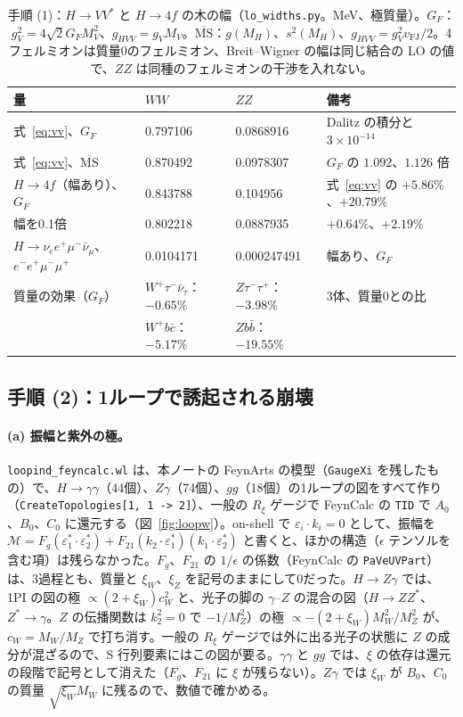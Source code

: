 \documentclass[a4paper,10pt]{ltjsarticle}
\newcommand{\MSbar}{\overline{\mathrm{MS}}}
\begin{document}
\begin{table}[tbp]
\centering\small
\caption{手順 (1)：$H\to VV^*$ と $H\to4f$ の木の幅（\texttt{lo\_widths.py}。MeV、極質量）。$G_F$：$g_V^2=4\sqrt2G_FM_V^2$、$g_{HVV}=g_VM_V$。$\MSbar$：$g(M_H)$、$s^2(M_H)$、$g_{HVV}=g_V^2v_{\mathrm{FJ}}/2$。4フェルミオンは質量0のフェルミオン、Breit--Wigner の幅は同じ結合の LO の値で、$ZZ$ は同種のフェルミオンの干渉を入れない。}
\label{tab:lohvv}
\begin{tabular}{llll}
\toprule
量 & $WW$ & $ZZ$ & 備考 \\
\midrule
式~\eqref{eq:vv}、$G_F$ & 0.797106 & 0.0868916 & Dalitz の積分と $3\times10^{-14}$ \\
式~\eqref{eq:vv}、$\MSbar$ & 0.870492 & 0.0978307 & $G_F$ の $1.092$、$1.126$ 倍 \\
$H\to4f$（幅あり）、$G_F$ & 0.843788 & 0.104956 & 式~\eqref{eq:vv} の $+5.86\%$、$+20.79\%$ \\
\quad 幅を0.1倍 & 0.802218 & 0.0887935 & $+0.64\%$、$+2.19\%$ \\
$H\to\nu_ee^+\mu^-\bar\nu_\mu$、$e^-e^+\mu^-\mu^+$ & 0.0104171 & 0.000247491 & 幅あり、$G_F$ \\
\midrule
質量の効果（$G_F$） & $W^+\tau^-\bar\nu_\tau$：$-0.65\%$ & $Z\tau^-\tau^+$：$-3.98\%$ & 3体、質量0との比 \\
 & $W^+b\bar c$：$-5.17\%$ & $Zb\bar b$：$-19.55\%$ & \\
\bottomrule
\end{tabular}
\end{table}

\subsection{手順 (2)：1ループで誘起される崩壊}\label{sec:step2}

\paragraph{(a) 振幅と紫外の極。}\texttt{loopind\_feyncalc.wl} は、本ノートの FeynArts の模型（\texttt{GaugeXi} を残したもの）で、$H\to\gamma\gamma$（44個）、$Z\gamma$（74個）、$gg$（18個）の1ループの図をすべて作り（\texttt{CreateTopologies[1, 1 -> 2]}）、一般の $R_\xi$ ゲージで FeynCalc の \texttt{TID} で $A_0$、$B_0$、$C_0$ に還元する（図~\ref{fig:loopw}）。on-shell で $\varepsilon_i\cdot k_i=0$ として、振幅を $\mathcal M=F_g(\varepsilon_1^*\cdot\varepsilon_2^*)+F_{21}(k_2\cdot\varepsilon_1^*)(k_1\cdot\varepsilon_2^*)$ と書くと、ほかの構造（$\epsilon$ テンソルを含む項）は残らなかった。$F_g$、$F_{21}$ の $1/\epsilon$ の係数（FeynCalc の \texttt{PaVeUVPart}）は、3過程とも、質量と $\xi_W$、$\xi_Z$ を記号のままにして0だった。$H\to Z\gamma$ では、1PI の図の極 $\propto(2+\xi_W)c_W^2$ と、光子の脚の $\gamma$--$Z$ の混合の図（$H\to ZZ^*$、$Z^*\to\gamma$。$Z$ の伝播関数は $k_2^2=0$ で $-1/M_Z^2$）の極 $\propto-(2+\xi_W)M_W^2/M_Z^2$ が、$c_W=M_W/M_Z$ で打ち消す。一般の $R_\xi$ ゲージでは外に出る光子の状態に $Z$ の成分が混ざるので、S 行列要素にはこの図が要る。$\gamma\gamma$ と $gg$ では、$\xi$ の依存は還元の段階で記号として消えた（$F_g$、$F_{21}$ に $\xi$ が残らない）。$Z\gamma$ では $\xi_W$ が $B_0$、$C_0$ の質量 $\sqrt{\xi_W}M_W$ に残るので、数値で確かめる。
\end{document}
